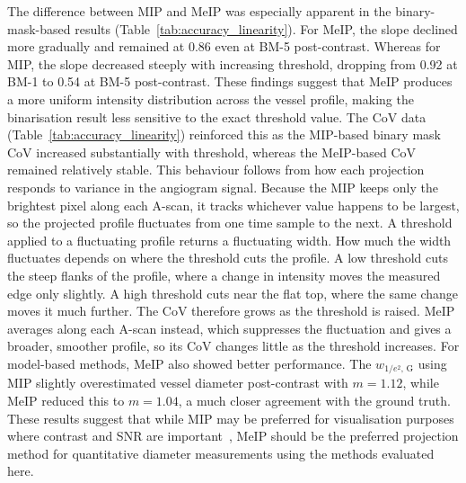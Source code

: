 The difference between MIP and MeIP was especially apparent in the binary-mask-based results (Table~\ref{tab:accuracy_linearity}). For MeIP, the slope declined more gradually and remained at 0.86 even at BM-5 post-contrast. Whereas for MIP, the slope decreased steeply with increasing threshold, dropping from 0.92 at BM-1 to 0.54 at BM-5 post-contrast. These findings suggest that MeIP produces a more uniform intensity distribution across the vessel profile, making the binarisation result less sensitive to the exact threshold value. The CoV data (Table~\ref{tab:accuracy_linearity}) reinforced this as the MIP-based binary mask CoV increased substantially with threshold, whereas the MeIP-based CoV remained relatively stable. This behaviour follows from how each projection responds to variance in the angiogram signal. Because the MIP keeps only the brightest pixel along each A-scan, it tracks whichever value happens to be largest, so the projected profile fluctuates from one time sample to the next. A threshold applied to a fluctuating profile returns a fluctuating width. How much the width fluctuates depends on where the threshold cuts the profile. A low threshold cuts the steep flanks of the profile, where a change in intensity moves the measured edge only slightly. A high threshold cuts near the flat top, where the same change moves it much further. The CoV therefore grows as the threshold is raised. MeIP averages along each A-scan instead, which suppresses the fluctuation and gives a broader, smoother profile, so its CoV changes little as the threshold increases. For model-based methods, MeIP also showed better performance. The $w_{1/e^2,\,\mathrm{G}}$ using MIP slightly overestimated vessel diameter post-contrast with $m = 1.12$, while MeIP reduced this to $m = 1.04$, a much closer agreement with the ground truth. These results suggest that while MIP may be preferred for visualisation purposes where contrast and SNR are important~\cite{hormelMaximumValueProjection2018}, MeIP should be the preferred projection method for quantitative diameter measurements using the methods evaluated here.


